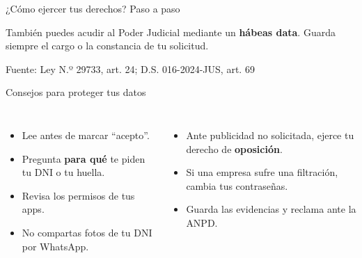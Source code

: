 \documentclass[aspectratio=169,11pt]{beamer}
\newcommand{\fuente}[1]{\par\vfill\hfill{\tiny\color{gray}Fuente: #1}}
\begin{document}
\begin{frame}{¿Cómo ejercer tus derechos? Paso a paso}
\begin{center}
\end{center}
\small También puedes acudir al Poder Judicial mediante un \textbf{hábeas data}. Guarda siempre el cargo o la constancia de tu solicitud.
\fuente{Ley N.º 29733, art. 24; D.S. 016-2024-JUS, art. 69}
\end{frame}

\begin{frame}{Consejos para proteger tus datos}
\begin{columns}[T]
\begin{itemize}\small
  \item Lee antes de marcar ``acepto''.
  \item Pregunta \textbf{para qué} te piden tu DNI o tu huella.
  \item Revisa los permisos de tus apps.
  \item No compartas fotos de tu DNI por WhatsApp.
\end{itemize}
\begin{itemize}\small
  \item Ante publicidad no solicitada, ejerce tu derecho de \textbf{oposición}.
  \item Si una empresa sufre una filtración, cambia tus contraseñas.
  \item Guarda las evidencias y reclama ante la ANPD.
\end{itemize}
\end{columns}
\end{frame}
\end{document}
